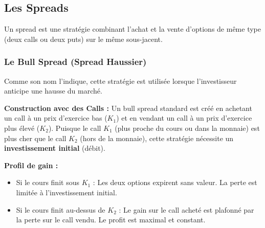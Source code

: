 \subsection{Les Spreads}

Un spread est une stratégie combinant l'achat et la vente d'options de même type (deux calls ou deux puts) sur le même sous-jacent.

\subsubsection{Le Bull Spread (Spread Haussier)}

Comme son nom l'indique, cette stratégie est utilisée lorsque l'investisseur anticipe une hausse du marché.

\textbf{Construction avec des Calls :}
Un bull spread standard est créé en achetant un call à un prix d'exercice bas ($K_1$) et en vendant un call à un prix d'exercice plus élevé ($K_2$).
Puisque le call $K_1$ (plus proche du cours ou dans la monnaie) est plus cher que le call $K_2$ (hors de la monnaie), cette stratégie nécessite un \textbf{investissement initial} (débit).

\textbf{Profil de gain :}
\begin{itemize}
    \item Si le cours finit sous $K_1$ : Les deux options expirent sans valeur. La perte est limitée à l'investissement initial.
    \item Si le cours finit au-dessus de $K_2$ : Le gain sur le call acheté est plafonné par la perte sur le call vendu. Le profit est maximal et constant.
\end{itemize}

\begin{center}
\end{center}

